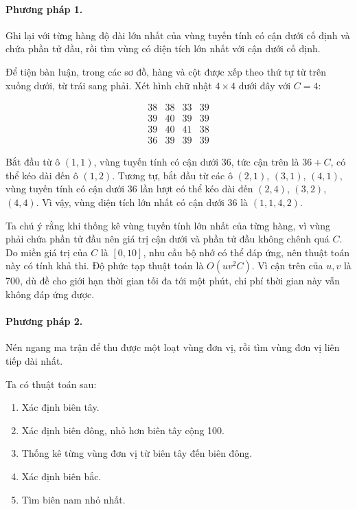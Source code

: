 \documentclass[11pt]{article}
\begin{document}
\paragraph{Phương pháp 1.}
Ghi lại với từng hàng độ dài lớn nhất của vùng tuyến tính có cận dưới cố định
và chứa phần tử đầu, rồi tìm vùng có diện tích lớn nhất với cận dưới cố định.

Để tiện bàn luận, trong các sơ đồ, hàng và cột được xếp theo thứ tự từ trên
xuống dưới, từ trái sang phải. Xét hình chữ nhật \(4\times4\) dưới đây với
\(C=4\):

\[
\begin{matrix}
38&38&33&39\\
39&40&39&39\\
39&40&41&38\\
36&39&39&39
\end{matrix}
\]

Bắt đầu từ ô \((1,1)\), vùng tuyến tính có cận dưới 36, tức cận trên là
\(36+C\), có thể kéo dài đến ô \((1,2)\). Tương tự, bắt đầu từ các ô
\((2,1)\), \((3,1)\), \((4,1)\), vùng tuyến tính có cận dưới 36 lần lượt có
thể kéo dài đến \((2,4)\), \((3,2)\), \((4,4)\). Vì vậy, vùng diện tích lớn
nhất có cận dưới 36 là \((1,1,4,2)\).

Ta chú ý rằng khi thống kê vùng tuyến tính lớn nhất của từng hàng, vì vùng
phải chứa phần tử đầu nên giá trị cận dưới và phần tử đầu không chênh quá
\(C\). Do miền giá trị của \(C\) là \([0,10]\), nhu cầu bộ nhớ có thể đáp
ứng, nên thuật toán này có tính khả thi. Độ phức tạp thuật toán là
\(O(uv^2C)\). Vì cận trên của \(u,v\) là 700, dù đề cho giới hạn thời gian
tối đa tới một phút, chi phí thời gian này vẫn không đáp ứng được.

\paragraph{Phương pháp 2.}
Nén ngang ma trận để thu được một loạt vùng đơn vị, rồi tìm vùng đơn vị liên
tiếp dài nhất.

Ta có thuật toán sau:

\begin{enumerate}
  \item Xác định biên tây.
  \item Xác định biên đông, nhỏ hơn biên tây cộng 100.
  \item Thống kê từng vùng đơn vị từ biên tây đến biên đông.
  \item Xác định biên bắc.
  \item Tìm biên nam nhỏ nhất.
\end{enumerate}
\end{document}
